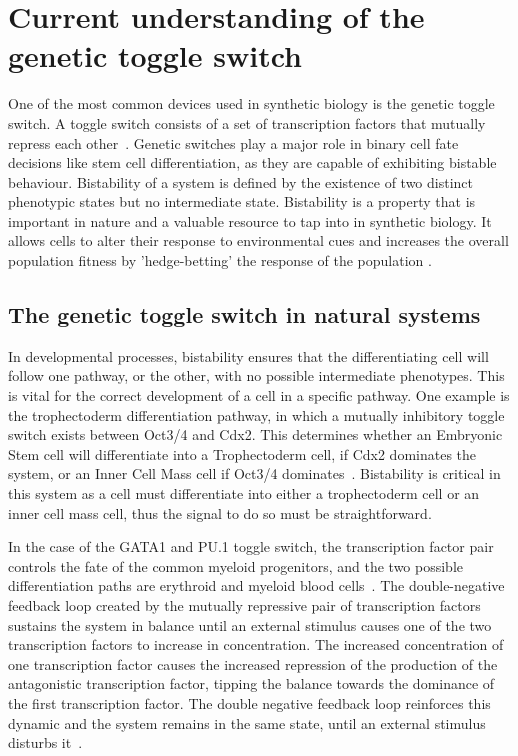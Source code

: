 


\section{Current understanding of the genetic toggle switch}

One of the most common devices used in synthetic biology is the genetic toggle switch. A toggle switch consists of a set of transcription factors that mutually repress each other~\autocite{Gardner:2000vha}. Genetic switches play a major role in binary cell fate decisions like stem cell differentiation, as they are capable of exhibiting bistable behaviour. Bistability of a system is defined by the existence of two distinct phenotypic states but no intermediate state. Bistability is a property that is important in nature and a valuable resource to tap into in synthetic biology. It allows cells to alter their response to environmental cues and increases the overall population fitness by 'hedge-betting' the response of the population \autocite{Veening:2008da}. 

\subsection{The genetic toggle switch in natural systems}
In developmental processes, bistability ensures that the differentiating cell will follow one pathway, or the other, with no possible intermediate phenotypes. This is vital for the correct development of a cell in a specific pathway. One example is the trophectoderm differentiation pathway, in which a mutually inhibitory toggle switch exists between Oct3/4 and Cdx2. This determines whether an Embryonic Stem cell will differentiate into a Trophectoderm cell, if Cdx2 dominates the system, or an Inner Cell Mass cell if Oct3/4 dominates~\autocite{Niwa:2005fz}. Bistability is critical in this system as a cell must differentiate into either a trophectoderm cell or an inner cell mass cell, thus the signal to do so must be straightforward. 

In the case of the GATA1 and PU.1 toggle switch, the transcription factor pair controls the fate of the common myeloid progenitors, and the two possible differentiation paths are erythroid and myeloid blood cells~\autocite{Chickarmane:2009by}. The double-negative feedback loop created by the mutually repressive pair of transcription factors sustains the system in balance until an external stimulus causes one of the two transcription factors to increase in concentration. The increased concentration of one transcription factor causes the increased repression of the production of the antagonistic transcription factor, tipping the balance towards the dominance of the first transcription factor. The double negative feedback loop reinforces this dynamic and the system remains in the same state, until an external stimulus disturbs it~\autocite{FerrellJr:2002fh}.

